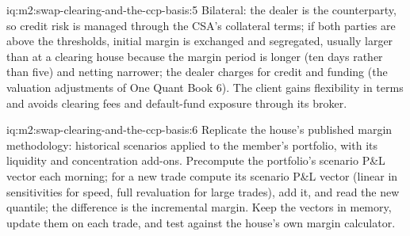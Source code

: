 \begin{solution}{iq:m2:swap-clearing-and-the-ccp-basis:5}
Bilateral: the dealer is the counterparty, so credit risk is managed through the
CSA's collateral terms; if both parties are above the thresholds, initial margin
is exchanged and segregated, usually larger than at a clearing house because
the margin period is longer (ten days rather than five) and netting narrower;
the dealer charges for credit and funding (the valuation adjustments of One
Quant Book 6). The client gains flexibility in terms and avoids clearing fees
and default-fund exposure through its broker.
\end{solution}

\begin{solution}{iq:m2:swap-clearing-and-the-ccp-basis:6}
Replicate the house's published margin methodology: historical scenarios
applied to the member's portfolio, with its liquidity and concentration
add-ons. Precompute the portfolio's scenario P\&L vector each morning; for a new
trade compute its scenario P\&L vector (linear in sensitivities for speed, full
revaluation for large trades), add it, and read the new quantile; the difference
is the incremental margin. Keep the vectors in memory, update them on each
trade, and test against the house's own margin calculator.
\end{solution}
